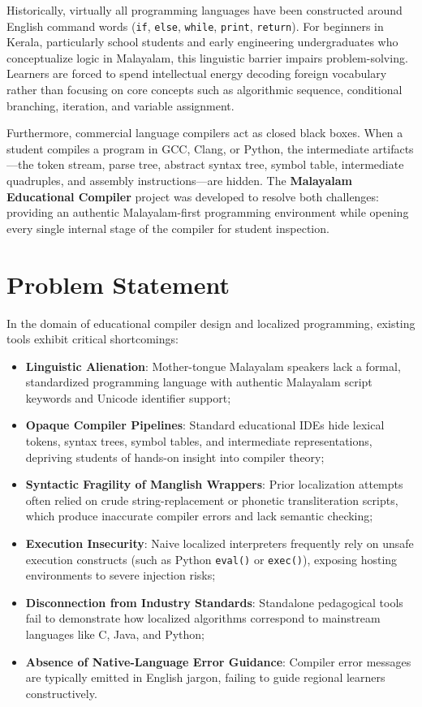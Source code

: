 \documentclass[12pt,a4paper]{report}
\begin{document}
Historically, virtually all programming languages have been constructed around English command words (\texttt{if}, \texttt{else}, \texttt{while}, \texttt{print}, \texttt{return}). For beginners in Kerala, particularly school students and early engineering undergraduates who conceptualize logic in Malayalam, this linguistic barrier impairs problem-solving. Learners are forced to spend intellectual energy decoding foreign vocabulary rather than focusing on core concepts such as algorithmic sequence, conditional branching, iteration, and variable assignment.

Furthermore, commercial language compilers act as closed black boxes. When a student compiles a program in GCC, Clang, or Python, the intermediate artifacts—the token stream, parse tree, abstract syntax tree, symbol table, intermediate quadruples, and assembly instructions—are hidden. The \textbf{Malayalam Educational Compiler} project was developed to resolve both challenges: providing an authentic Malayalam-first programming environment while opening every single internal stage of the compiler for student inspection.

\section{Problem Statement}
In the domain of educational compiler design and localized programming, existing tools exhibit critical shortcomings:
\begin{itemize}
    \item \textbf{Linguistic Alienation}: Mother-tongue Malayalam speakers lack a formal, standardized programming language with authentic Malayalam script keywords and Unicode identifier support;
    \item \textbf{Opaque Compiler Pipelines}: Standard educational IDEs hide lexical tokens, syntax trees, symbol tables, and intermediate representations, depriving students of hands-on insight into compiler theory;
    \item \textbf{Syntactic Fragility of Manglish Wrappers}: Prior localization attempts often relied on crude string-replacement or phonetic transliteration scripts, which produce inaccurate compiler errors and lack semantic checking;
    \item \textbf{Execution Insecurity}: Naive localized interpreters frequently rely on unsafe execution constructs (such as Python \texttt{eval()} or \texttt{exec()}), exposing hosting environments to severe injection risks;
    \item \textbf{Disconnection from Industry Standards}: Standalone pedagogical tools fail to demonstrate how localized algorithms correspond to mainstream languages like C, Java, and Python;
    \item \textbf{Absence of Native-Language Error Guidance}: Compiler error messages are typically emitted in English jargon, failing to guide regional learners constructively.
\end{itemize}
\end{document}
